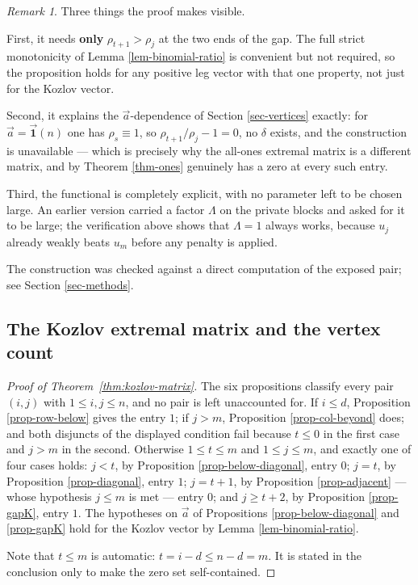 \documentclass[11pt, a4paper, abstract=yes]{scrartcl}
\theoremstyle{definition}
\theoremstyle{remark}
\newtheorem{remark}[definition]{Remark}
\theoremstyle{plain}
\newcommand{\onesvec}{\vec{\mathbf 1}}
\begin{document}
\begin{remark}
Three things the proof makes visible.

First, it needs \textbf{only} \(\rho_{t+1}>\rho_j\) at the two ends of the gap. The full strict monotonicity
of Lemma \ref{lem-binomial-ratio} is convenient but not required, so the proposition holds for any
positive leg vector with that one property, not just for the Kozlov vector.

Second, it explains the \(\vec a\)-dependence of Section \ref{sec-vertices} exactly: for
\(\vec a=\onesvec(n)\) one has \(\rho_s\equiv1\), so \(\rho_{t+1}/\rho_j-1=0\), no \(\delta\) exists,
and the construction is unavailable --- which is precisely why the all-ones extremal matrix is a
different matrix, and by Theorem \ref{thm-ones} genuinely has a zero at every such entry.

Third, the functional is completely explicit, with no parameter left to be chosen large. An earlier
version carried a factor \(\Lambda\) on the private blocks and asked for it to be large; the
verification above shows that \(\Lambda=1\) always works, because \(u_j\) already weakly beats
\(u_m\) before any penalty is applied.

The construction was checked against a direct computation of the exposed pair; see
Section \ref{sec-methods}.
\label{rem-gapK}
\end{remark}
\subsection{The Kozlov extremal matrix and the vertex count}
\label{sec-app-kozlov}
\begin{proof}[Proof of Theorem~\ref{thm:kozlov-matrix}]
The six propositions classify every pair \((i,j)\) with \(1\le i,j\le n\), and no pair is left
unaccounted for. If \(i\le d\), Proposition \ref{prop-row-below} gives the entry \(1\); if \(j>m\),
Proposition \ref{prop-col-beyond} does;
and both disjuncts of the displayed condition fail because \(t\le0\) in the first case and \(j>m\) in
the second. Otherwise \(1\le t\le m\) and \(1\le j\le m\), and exactly one of four cases holds:
\(j<t\), by Proposition \ref{prop-below-diagonal}, entry \(0\); \(j=t\), by
Proposition \ref{prop-diagonal}, entry \(1\); \(j=t+1\), by Proposition \ref{prop-adjacent} --- whose
hypothesis \(j\le m\) is met --- entry \(0\); and \(j\ge t+2\), by Proposition \ref{prop-gapK}, entry
\(1\). The hypotheses on \(\vec a\) of Propositions \ref{prop-below-diagonal} and \ref{prop-gapK} hold for
the Kozlov vector by Lemma \ref{lem-binomial-ratio}.

Note that \(t\le m\) is automatic: \(t=i-d\le n-d=m\). It is stated in the conclusion only to make
the zero set self-contained.
\end{proof}
\end{document}
